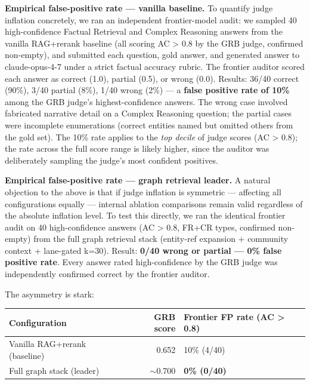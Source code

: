 \documentclass[
]{article}
\begin{document}
\textbf{Empirical false-positive rate --- vanilla baseline.} To quantify
judge inflation concretely, we ran an independent frontier-model audit:
we sampled 40 high-confidence Factual Retrieval and Complex Reasoning
answers from the vanilla RAG+rerank baseline (all scoring AC
\textgreater{} 0.8 by the GRB judge, confirmed non-empty), and submitted
each question, gold answer, and generated answer to claude-opus-4-7
under a strict factual accuracy rubric. The frontier auditor scored each
answer as correct (1.0), partial (0.5), or wrong (0.0). Results: 36/40
correct (90\%), 3/40 partial (8\%), 1/40 wrong (2\%) --- a \textbf{false
positive rate of 10\%} among the GRB judge's highest-confidence answers.
The wrong case involved fabricated narrative detail on a Complex
Reasoning question; the partial cases were incomplete enumerations
(correct entities named but omitted others from the gold set). The 10\%
rate applies to the \emph{top decile} of judge scores (AC \textgreater{}
0.8); the rate across the full score range is likely higher, since the
auditor was deliberately sampling the judge's most confident positives.

\textbf{Empirical false-positive rate --- graph retrieval leader.} A
natural objection to the above is that if judge inflation is symmetric
--- affecting all configurations equally --- internal ablation
comparisons remain valid regardless of the absolute inflation level. To
test this directly, we ran the identical frontier audit on 40
high-confidence answers (AC \textgreater{} 0.8, FR+CR types, confirmed
non-empty) from the full graph retrieval stack (entity-ref expansion +
community context + lane-gated k=30). Result: \textbf{0/40 wrong or
partial --- 0\% false positive rate}. Every answer rated high-confidence
by the GRB judge was independently confirmed correct by the frontier
auditor.

The asymmetry is stark:

\begin{small}
\setlength{\tabcolsep}{4pt}
\begin{longtable}{p{2.5in}rp{2.5in}}
\toprule
\textbf{Configuration} & \textbf{GRB score} & \textbf{Frontier FP rate (AC > 0.8)} \\
\midrule
\endhead
Vanilla RAG+rerank (baseline) & 0.652 & 10\% (4/40) \\
Full graph stack (leader) & $\sim$0.700 & \textbf{0\% (0/40)} \\
\bottomrule
\end{longtable}
\end{small}
\end{document}
